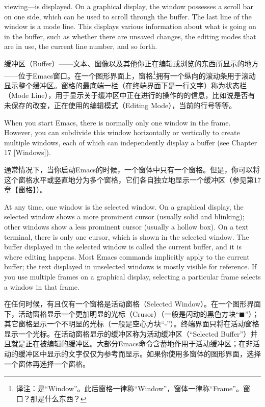 viewing—is displayed. On a graphical display, the window possesses a scroll bar on one
side, which can be used to scroll through the buffer. The last line of the window is a mode
line. This displays various information about what is going on in the buffer, such as whether
there are unsaved changes, the editing modes that are in use, the current line number, and
so forth.
\par
缓冲区（Buffer）——文本、图像以及其他你正在编辑或浏览的东西所显示的地方——位于Emacs窗口。在一个图形界面上，窗格\footnote{译注：是“Window”。此后窗格一律称“Window”，窗体一律称“Frame”。窗口？那是什么东西？}拥有一个纵向的滚动条用于滚动显示整个缓冲区。窗格的最底端一栏（在终端界面下是一行文字）称为状态栏（Mode Line），用于显示关于缓冲区中正在进行的操作的的信息，比如说是否有未保存的改变，正在使用的编辑模式（Editing Mode），当前的行号等等。\par
When you start Emacs, there is normally only one window in the frame. However, you
can subdivide this window horizontally or vertically to create multiple windows, each of
which can independently display a buffer (see Chapter 17 [Windows]).
\par
通常情况下，当你启动Emacs的时候，一个窗体中只有一个窗格。但是，你可以将这个窗格水平或竖直地分为多个窗格，它们各自独立地显示一个缓冲区（参见第17章【窗格】）。\par
At any time, one window is the selected window. On a graphical display, the selected
window shows a more prominent cursor (usually solid and blinking); other windows show a
less prominent cursor (usually a hollow box). On a text terminal, there is only one cursor,
which is shown in the selected window. The buffer displayed in the selected window is
called the current buffer, and it is where editing happens. Most Emacs commands implicitly
apply to the current buffer; the text displayed in unselected windows is mostly visible for
reference. If you use multiple frames on a graphical display, selecting a particular frame
selects a window in that frame.\par
在任何时候，有且仅有一个窗格是活动窗格（Selected Window）。在一个图形界面下，活动窗格显示一个更加明显的光标（Crusor）（一般是闪动的黑色方块“$\blacksquare$”）；其它窗格显示一个不明显的光标（一般是空心方块“$\square$”）。终端界面只将在活动窗格显示一个光标。在活动窗格显示的缓冲区称为活动缓冲区（“Selected Buffer”）并且就是正在被编辑的缓冲区。大部分Emacs命令含蓄地作用于活动缓冲区；在非活动的缓冲区中显示的文字仅仅为参考而显示。如果你使用多窗体的图形界面，选择一个窗体再选择一个窗格。